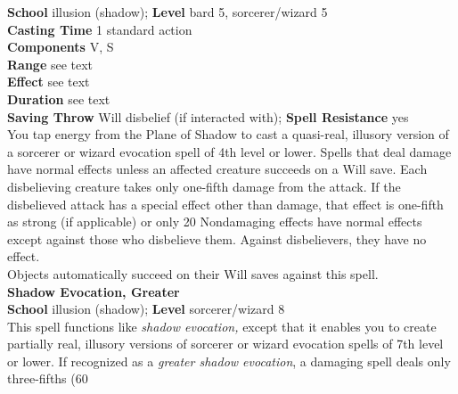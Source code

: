 \textbf{School} illusion (shadow); \textbf{Level} bard 5, sorcerer/wizard 5\\
\textbf{Casting Time} 1 standard action\\
\textbf{Components} V, S\\
\textbf{Range} see text\\
\textbf{Effect} see text\\
\textbf{Duration} see text\\
\textbf{Saving Throw }Will disbelief (if interacted with); \textbf{Spell Resistance} yes\\
You tap energy from the Plane of Shadow to cast a quasi-real, illusory version of a sorcerer or wizard evocation spell of 4th level or lower. Spells that deal damage have normal effects unless an affected creature succeeds on a Will save. Each disbelieving creature takes only one-fifth damage from the attack. If the disbelieved attack has a special effect other than damage, that effect is one-fifth as strong (if applicable) or only 20%
Nondamaging effects have normal effects except against those who disbelieve them. Against disbelievers, they have no effect.\\
Objects automatically succeed on their Will saves against this spell.\\
\textbf{Shadow Evocation, Greater}\\
\textbf{School} illusion (shadow); \textbf{Level} sorcerer/wizard 8\\
This spell functions like \textit{shadow evocation, }except that it enables you to create partially real, illusory versions of sorcerer or wizard evocation spells of 7th level or lower. If recognized as a \textit{greater shadow evocation}, a damaging spell deals only three-fifths (60%
